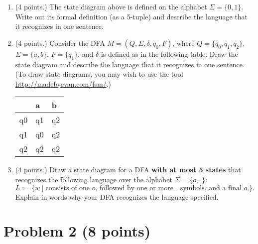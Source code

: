 \documentclass[letterpaper,11pt,twoside]{article}
\theoremstyle{plain}
\theoremstyle{definition}
\theoremstyle{remark}
\theoremstyle{restate}
\begin{document}
\begin{enumerate}
    \item (4 points.) The state diagram above is defined on the alphabet $\Sigma = \{0,1\}$. Write out its formal definition (as a 5-tuple) and describe the language that it recognizes in one sentence.
    
    \item (4 points.) Consider the DFA $M = (Q, \Sigma, \delta, q_0, F)$, where $Q = \{q_0, q_1, q_2\}$, $\Sigma = \{a, b\}$, $F = \{q_1\}$, and $\delta$ is defined as in the following table. Draw the state diagram and describe the language that it recognizes in one sentence. (To draw state diagrams, you may wish to use the tool \url{http://madebyevan.com/fsm/}.)
    
    \begin{table}[h!]
    \centering
    \begin{tabular}{@{}l|ll@{}}
       & a  & b  \\ \midrule
    q0 & q1 & q2 \\
    q1 & q0 & q2 \\
    q2 & q2 & q2
    \end{tabular}
    \end{table}
    
    \item (4 points.) Draw a state diagram for a DFA \textbf{with at most 5 states} that recognizes the following language over the alphabet $\Sigma = \{o, \_\}$: 
    \[
        L := \{w \; | \; \text{consists of one $o$, followed by one or more $\_$ symbols, and a final $o$.}\}.
    \]
    Explain in words why your DFA recognizes the language specified.
 
\end{enumerate}


\clearpage

\section{Problem 2 (8 points)}
\end{document}

